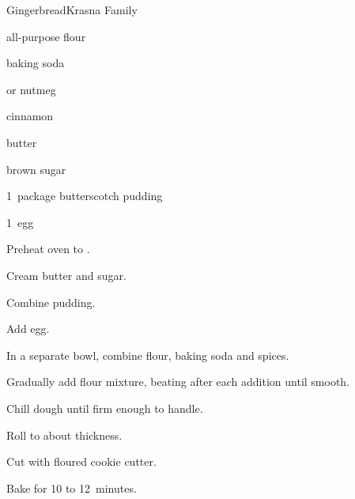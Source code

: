 \begin{recipe}{Gingerbread}{Krasna Family}{}

\begin{ingredients}
\item \C{1\half} all-purpose flour
\item {} baking soda
\item {}  or nutmeg
\item \tp{1\half} cinnamon
\item \C{\half} butter
\item \C{\half} brown sugar
\item 1~package butterscotch pudding
\item 1~egg
\end{ingredients}

\begin{directions}
\item Preheat oven to .
\item Cream butter and sugar.
\item Combine pudding.
\item Add egg.
\item In a separate bowl, combine flour, baking soda and spices.
\item Gradually add flour mixture, beating after each addition until smooth.
\item Chill dough until firm enough to handle.
\item Roll to about  thickness.
\item Cut with floured cookie cutter.
\item Bake for 10 to 12~minutes.
\end{directions}
\end{recipe}
